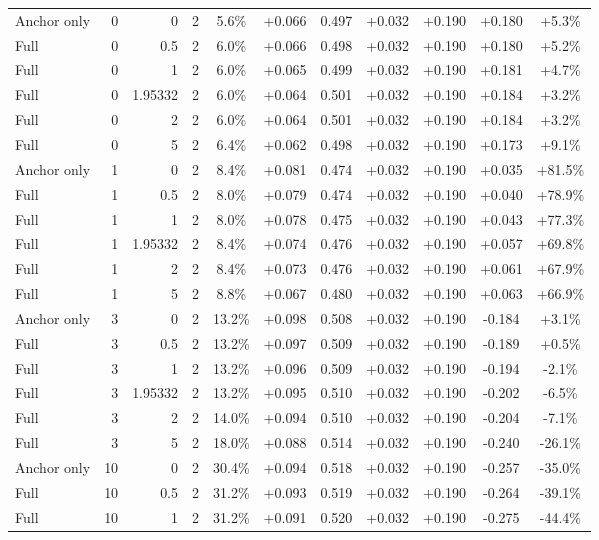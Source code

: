 \begin{table}[htbp]
\begin{tabular}{lrrrccccccc}
Anchor only & 0 & 0 & 2 & 5.6\% & +0.066 & 0.497 & +0.032 & +0.190 & +0.180 & +5.3\% \\
Full & 0 & 0.5 & 2 & 6.0\% & +0.066 & 0.498 & +0.032 & +0.190 & +0.180 & +5.2\% \\
Full & 0 & 1 & 2 & 6.0\% & +0.065 & 0.499 & +0.032 & +0.190 & +0.181 & +4.7\% \\
Full & 0 & 1.95332 & 2 & 6.0\% & +0.064 & 0.501 & +0.032 & +0.190 & +0.184 & +3.2\% \\
Full & 0 & 2 & 2 & 6.0\% & +0.064 & 0.501 & +0.032 & +0.190 & +0.184 & +3.2\% \\
Full & 0 & 5 & 2 & 6.4\% & +0.062 & 0.498 & +0.032 & +0.190 & +0.173 & +9.1\% \\
Anchor only & 1 & 0 & 2 & 8.4\% & +0.081 & 0.474 & +0.032 & +0.190 & +0.035 & +81.5\% \\
Full & 1 & 0.5 & 2 & 8.0\% & +0.079 & 0.474 & +0.032 & +0.190 & +0.040 & +78.9\% \\
Full & 1 & 1 & 2 & 8.0\% & +0.078 & 0.475 & +0.032 & +0.190 & +0.043 & +77.3\% \\
Full & 1 & 1.95332 & 2 & 8.4\% & +0.074 & 0.476 & +0.032 & +0.190 & +0.057 & +69.8\% \\
Full & 1 & 2 & 2 & 8.4\% & +0.073 & 0.476 & +0.032 & +0.190 & +0.061 & +67.9\% \\
Full & 1 & 5 & 2 & 8.8\% & +0.067 & 0.480 & +0.032 & +0.190 & +0.063 & +66.9\% \\
Anchor only & 3 & 0 & 2 & 13.2\% & +0.098 & 0.508 & +0.032 & +0.190 & -0.184 & +3.1\% \\
Full & 3 & 0.5 & 2 & 13.2\% & +0.097 & 0.509 & +0.032 & +0.190 & -0.189 & +0.5\% \\
Full & 3 & 1 & 2 & 13.2\% & +0.096 & 0.509 & +0.032 & +0.190 & -0.194 & -2.1\% \\
Full & 3 & 1.95332 & 2 & 13.2\% & +0.095 & 0.510 & +0.032 & +0.190 & -0.202 & -6.5\% \\
Full & 3 & 2 & 2 & 14.0\% & +0.094 & 0.510 & +0.032 & +0.190 & -0.204 & -7.1\% \\
Full & 3 & 5 & 2 & 18.0\% & +0.088 & 0.514 & +0.032 & +0.190 & -0.240 & -26.1\% \\
Anchor only & 10 & 0 & 2 & 30.4\% & +0.094 & 0.518 & +0.032 & +0.190 & -0.257 & -35.0\% \\
Full & 10 & 0.5 & 2 & 31.2\% & +0.093 & 0.519 & +0.032 & +0.190 & -0.264 & -39.1\% \\
Full & 10 & 1 & 2 & 31.2\% & +0.091 & 0.520 & +0.032 & +0.190 & -0.275 & -44.4\% \\

\end{tabular}
\end{table}
